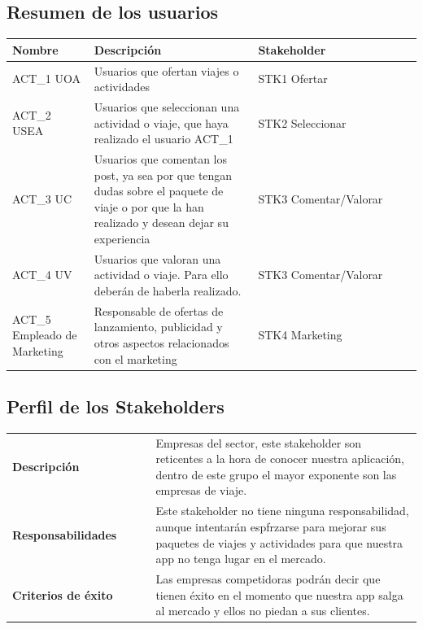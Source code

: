 \documentclass[11pt]{article}
\begin{document}
\subsection{Resumen de los usuarios}
\begin{table}[H]
  \centering
  \begin{tabular}{p{0.2\linewidth}p{0.4\linewidth}p{0.4\linewidth}}
    \toprule
    \textbf{Nombre} & \textbf{Descripción} & \textbf{Stakeholder} \\
    \midrule
    ACT\_1 UOA & Usuarios que ofertan viajes o actividades & STK1 Ofertar\\
    ACT\_2 USEA & Usuarios que seleccionan una actividad o viaje, que haya realizado el usuario ACT\_1 & STK2 Seleccionar\\
    ACT\_3 UC & Usuarios que comentan los post, ya sea por que tengan dudas sobre el paquete de viaje o por que la han realizado y desean dejar su experiencia & STK3 Comentar/Valorar\\
    ACT\_4 UV & Usuarios que valoran una actividad o viaje. Para ello deberán de haberla realizado. & STK3 Comentar/Valorar\\
    ACT\_5  Empleado de Marketing & Responsable de ofertas de lanzamiento, publicidad y otros aspectos relacionados con el marketing & STK4 Marketing\\
    \bottomrule
  \end{tabular}
\end{table}

\subsection{Perfil de los Stakeholders}

\begin{table}[H]
  \centering
  \begin{tabular}{p{0.35\linewidth}|p{0.65\linewidth}}
    \toprule
       \textbf{Descripción} & Empresas del sector, este stakeholder son reticentes a la hora de conocer nuestra aplicación, dentro de este grupo el mayor exponente son las empresas de viaje.\\ 
    \textbf{Responsabilidades} & Este stakeholder no tiene ninguna responsabilidad, aunque intentarán espfrzarse para mejorar sus paquetes de viajes y actividades para que nuestra app no tenga lugar en el mercado. \\
    \textbf{Criterios de éxito} & Las empresas competidoras podrán decir que tienen éxito en el momento que nuestra app salga al mercado y ellos no piedan a sus clientes. \\
    \bottomrule
  \end{tabular}
\end{table}
\end{document}
